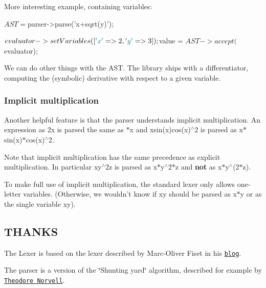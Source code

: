 More interesting example, containing variables\-:


\begin{DoxyCode}
$AST = $parser->parse(\textcolor{stringliteral}{'x+sqrt(y)'});

$evaluator->setVariables([ \textcolor{charliteral}{'x'} => 2, \textcolor{charliteral}{'y'} => 3 ]);
$value = $AST->accept($evaluator);
\end{DoxyCode}


We can do other things with the A\-S\-T. The library ships with a differentiator, computing the (symbolic) derivative with respect to a given variable.




\subsubsection*{Implicit multiplication}

Another helpful feature is that the parser understands implicit multiplication. An expression as {\ttfamily 2x} is parsed the same as {$\ast$x} and {\ttfamily xsin(x)cos(x)$^\wedge$2} is parsed as {\ttfamily x$\ast$sin(x)$\ast$cos(x)$^\wedge$2}.

Note that implicit multiplication has the same precedence as explicit multiplication. In particular {\ttfamily xy$^\wedge$2z} is parsed as {\ttfamily x$\ast$y$^\wedge$2$\ast$z} and {\bfseries not} as {\ttfamily x$\ast$y$^\wedge$(2$\ast$z)}.

To make full use of implicit multiplication, the standard lexer only allows one-\/letter variables. (Otherwise, we wouldn't know if {\ttfamily xy} should be parsed as {\ttfamily x$\ast$y} or as the single variable {\ttfamily xy}).

\subsection*{T\-H\-A\-N\-K\-S }

The Lexer is based on the lexer described by Marc-\/\-Oliver Fiset in his \href{http://marcofiset.com/programming-language-implementation-part-1-lexer/}{\tt blog}.

The parser is a version of the \char`\"{}\-Shunting yard\char`\"{} algorithm, described for example by \href{http://www.engr.mun.ca/~theo/Misc/exp_parsing.htm#shunting_yard}{\tt Theodore Norvell}. 